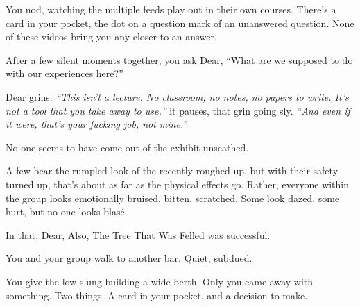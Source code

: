 You nod, watching the multiple feeds play out in their own courses. There's a card in your pocket, the dot on a question mark of an unanswered question. None of these videos bring you any closer to an answer.

After a few silent moments together, you ask Dear, ``What are we supposed to do with our experiences here?''

Dear grins. \emph{``This isn't a lecture. No classroom, no notes, no papers to write. It's not a tool that you take away to use,''} it pauses, that grin going sly. \emph{``And even if it were, that's your fucking job, not mine.''}

\newpage

\null
\vfill

No one seems to have come out of the exhibit unscathed.

A few bear the rumpled look of the recently roughed-up, but with their safety turned up, that's about as far as the physical effects go. Rather, everyone within the group looks emotionally bruised, bitten, scratched. Some look dazed, some hurt, but no one looks blasé.

In that, Dear, Also, The Tree That Was Felled was successful.

You and your group walk to another bar. Quiet, subdued.

You give the low-slung building a wide berth. Only you came away with something. Two things. A card in your pocket, and a decision to make.

\vfill
